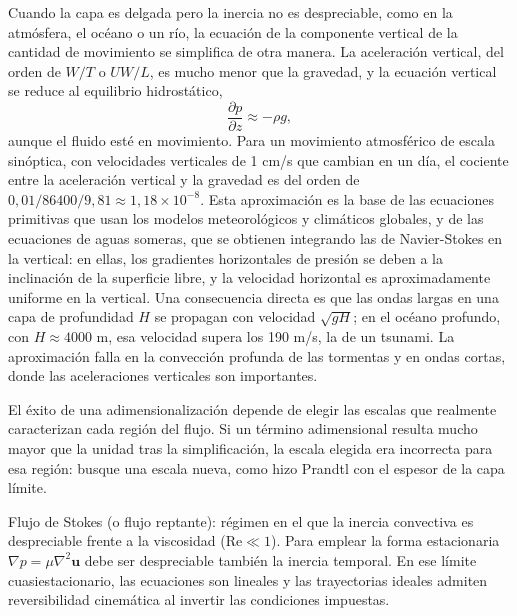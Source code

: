 \documentclass[10pt,openany]{book}
\begin{document}
Cuando la capa es delgada pero la inercia no es despreciable, como en la atmósfera, el océano o un río, la ecuación de la componente vertical de la cantidad de movimiento se simplifica de otra manera. La aceleración vertical, del orden de \(W/T\) o \(UW/L\), es mucho menor que la gravedad, y la ecuación vertical se reduce al equilibrio hidrostático,
\begin{equation}
\frac{\partial p}{\partial z} \approx -\rho g, \label{eq:c15-hidrostatica}
\end{equation}
aunque el fluido esté en movimiento. Para un movimiento atmosférico de escala sinóptica, con velocidades verticales de 1 cm/s que cambian en un día, el cociente entre la aceleración vertical y la gravedad es del orden de \(0{,}01/86400/9{,}81 \approx 1{,}18\times 10^{-8}\). Esta aproximación es la base de las ecuaciones primitivas que usan los modelos meteorológicos y climáticos globales, y de las ecuaciones de aguas someras, que se obtienen integrando las de Navier-Stokes en la vertical: en ellas, los gradientes horizontales de presión se deben a la inclinación de la superficie libre, y la velocidad horizontal es aproximadamente uniforme en la vertical. Una consecuencia directa es que las ondas largas en una capa de profundidad \(H\) se propagan con velocidad \(\sqrt{gH}\); en el océano profundo, con \(H \approx 4000\) m, esa velocidad supera los 190 m/s, la de un tsunami. La aproximación falla en la convección profunda de las tormentas y en ondas cortas, donde las aceleraciones verticales son importantes.

\begin{tcolorbox}[title={Consejo}, studiumtip, breakable]

El éxito de una adimensionalización depende de elegir las escalas que realmente caracterizan cada región del flujo. Si un término adimensional resulta mucho mayor que la unidad tras la simplificación, la escala elegida era incorrecta para esa región: busque una escala nueva, como hizo Prandtl con el espesor de la capa límite.
\end{tcolorbox}

\begin{tcolorbox}[title={Definición}, studiumdef, breakable]

Flujo de Stokes (o flujo reptante): régimen en el que la inercia convectiva es despreciable frente a la viscosidad (\(\mathrm{Re}\ll1\)). Para emplear la forma estacionaria \(\nabla p=\mu\nabla^{2}\mathbf{u}\) debe ser despreciable también la inercia temporal. En ese límite cuasiestacionario, las ecuaciones son lineales y las trayectorias ideales admiten reversibilidad cinemática al invertir las condiciones impuestas.
\end{tcolorbox}
\end{document}
